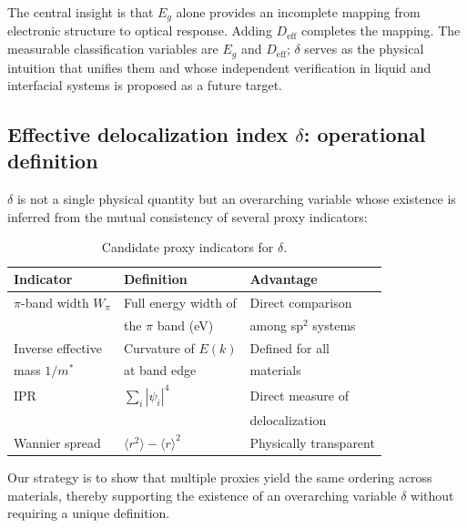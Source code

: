 \documentclass[twocolumn,showpacs,preprintnumbers,amsmath,amssymb,prb]{revtex4-2}
\begin{document}
The central insight is that $E_g$ alone provides an incomplete mapping
from electronic structure to optical response. Adding $D_\mathrm{eff}$
completes the mapping. The measurable classification variables are
$E_g$ and $D_\mathrm{eff}$; $\delta$ serves as the physical intuition
that unifies them and whose independent verification in liquid and
interfacial systems is proposed as a future target.

\subsection{Effective delocalization index $\delta$: operational definition}

$\delta$ is not a single physical quantity but an overarching variable
whose existence is inferred from the mutual consistency of several proxy
indicators:

\begin{table}[h]
\caption{Candidate proxy indicators for $\delta$.}
\label{tab:delta_proxies}
\begin{ruledtabular}
\begin{tabular}{lll}
  Indicator & Definition & Advantage \\
  \hline
  $\pi$-band width $W_\pi$ & Full energy width of & Direct comparison \\
   & the $\pi$ band (eV) & among sp$^2$ systems \\
  Inverse effective & Curvature of $E(k)$ & Defined for all \\
  mass $1/m^*$ & at band edge & materials \\
  IPR & $\sum_i |\psi_i|^4$ & Direct measure of \\
   & & delocalization \\
  Wannier spread & $\langle r^2 \rangle - \langle r \rangle^2$ &
  Physically transparent \\
\end{tabular}
\end{ruledtabular}
\end{table}

Our strategy is to show that multiple proxies yield the same ordering
across materials, thereby supporting the existence of an overarching
variable $\delta$ without requiring a unique definition.
\end{document}
